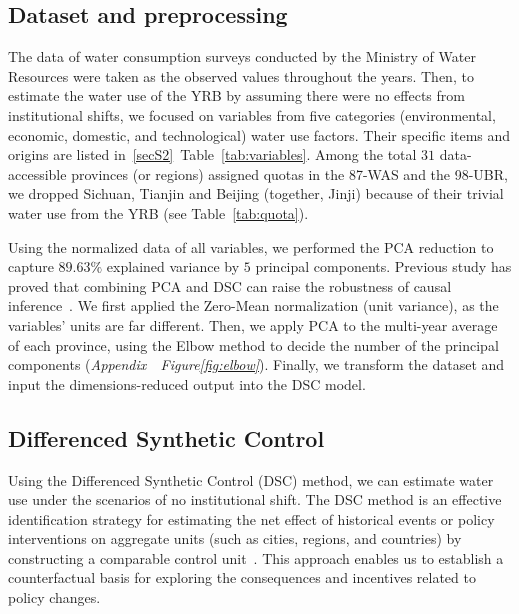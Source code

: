 \subsection{Dataset and preprocessing}\label{sec:dataset}
The data of water consumption surveys conducted by the Ministry of Water Resources were taken as the observed values throughout the years.
Then, to estimate the water use of the YRB by assuming there were no effects from institutional shifts, we focused on variables from five categories (environmental, economic, domestic, and technological) water use factors. Their specific items and origins are listed in~\ref{secS2}~Table~\ref{tab:variables}.
Among the total $31$ data-accessible provinces (or regions) assigned quotas in the 87-WAS and the 98-UBR, we dropped Sichuan, Tianjin and Beijing (together, Jinji) because of their trivial water use from the YRB (see Table~\ref{tab:quota}).

Using the normalized data of all variables, we performed the PCA reduction to capture $89.63\%$ explained variance by $5$ principal components.
Previous study has proved that combining PCA and DSC can raise the robustness of causal inference~\cite{bayani2021}.
We first applied the Zero-Mean normalization (unit variance), as the variables' units are far different. Then, we apply PCA to the multi-year average of each province, using the Elbow method to decide the number of the principal components (\textit{Appendix~~Figure\ref{fig:elbow}}).
Finally, we transform the dataset and input the dimensions-reduced output into the DSC model.

\subsection{Differenced Synthetic Control}\label{sec:DSC}
Using the Differenced Synthetic Control (DSC) method, we can estimate water use under the scenarios of no institutional shift.
The DSC method is an effective identification strategy for estimating the net effect of historical events or policy interventions on aggregate units (such as cities, regions, and countries) by constructing a comparable control unit~\cite{abadie2010, abadie2015, hill2021}.
This approach enables us to establish a counterfactual basis for exploring the consequences and incentives related to policy changes.

